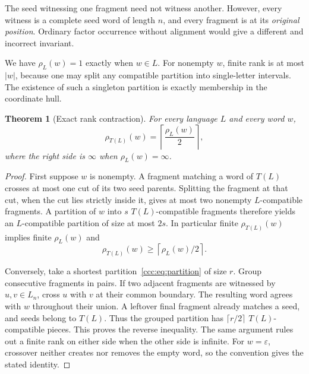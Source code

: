 \documentclass[11pt,letterpaper]{article}
\newtheorem{theorem}{Theorem}[section]
\theoremstyle{definition}
\theoremstyle{remark}
\newcommand{\eps}{\varepsilon}
\newcommand{\rank}{\rho}
\begin{document}
The seed witnessing one fragment need not witness another. However, every
witness is a complete seed word of length $n$, and every fragment is at its
\emph{original position}. Ordinary factor occurrence without alignment would
give a different and incorrect invariant.

We have $\rank_L(w)=1$ exactly when $w\in L$. For nonempty $w$, finite rank is
at most $|w|$, because one may split any compatible partition into
single-letter intervals. The existence of such a singleton partition is
exactly membership in the coordinate hull.

\begin{theorem}[Exact rank contraction]\label{ccc:thm:contraction}
For every language $L$ and every word $w$,
\begin{equation}
 \rank_{T(L)}(w)=\left\lceil\frac{\rank_L(w)}2\right\rceil,
 \label{ccc:eq:contraction}
\end{equation}
where the right side is $\infty$ when $\rank_L(w)=\infty$.
\end{theorem}
\begin{proof}
First suppose $w$ is nonempty. A fragment matching a word of $T(L)$ crosses
at most one cut of its two seed parents. Splitting the fragment at that cut,
when the cut lies strictly inside it, gives at most two nonempty
$L$-compatible fragments. A partition of $w$ into $s$ $T(L)$-compatible
fragments therefore yields an $L$-compatible partition of size at most $2s$.
In particular finite $\rank_{T(L)}(w)$ implies finite $\rank_L(w)$ and
\[
 \rank_{T(L)}(w)\geq\left\lceil\rank_L(w)/2\right\rceil.
\]

Conversely, take a shortest partition~\eqref{ccc:eq:partition} of size $r$.
Group consecutive fragments in pairs. If two adjacent fragments are witnessed
by $u,v\in L_n$, cross $u$ with $v$ at their common boundary. The resulting
word agrees with $w$ throughout their union. A leftover final fragment already
matches a seed, and seeds belong to $T(L)$. Thus the grouped partition has
$\lceil r/2\rceil$ $T(L)$-compatible pieces. This proves the reverse inequality.
The same argument rules out a finite rank on either side when the other side
is infinite. For $w=\eps$, crossover neither creates nor removes the empty
word, so the convention gives the stated identity.
\end{proof}
\end{document}
